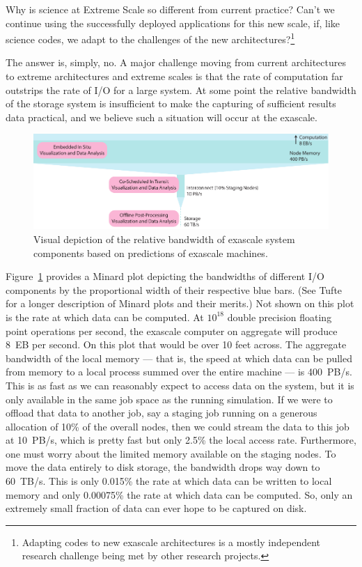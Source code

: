 Why is science at Extreme Scale so different from current practice?  Can't
we continue using the successfully deployed applications for this new
scale, if, like science codes, we adapt to the challenges of the new
architectures?\footnote{Adapting \vda codes to new exascale architectures
  is a mostly independent research challenge being met by other research
  projects.}

The answer is, simply, no.  A major challenge moving from current
architectures to extreme architectures and extreme scales is that the rate
of computation far outstrips the rate of I/O for a large system.  At some
point the relative bandwidth of the storage system is insufficient to make
the capturing of sufficient results data practical, and we believe such a
situation will occur at the exascale.

\begin{figure}[htb]
  \centering
  \includegraphics{figures/IOBandwidths}
  \caption[Relative bandwidth of exascale system components.]{Visual
    depiction of the relative bandwidth of exascale system components based
    on predictions of exascale
    machines.}
  \label{fig:IOBandwidths}
\end{figure}

Figure~\ref{fig:IOBandwidths} provides a Minard plot depicting the
bandwidths of different I/O components by the proportional width of their
respective blue bars.  (See Tufte for a longer description
of Minard plots and their merits.)  Not shown on this plot is the rate at
which data can be computed.  At $10^{18}$ double precision floating point
operations per second, the exascale computer on aggregate will produce 8~EB
per second.  On this plot that would be over 10 feet across.  The aggregate
bandwidth of the local memory --- that is, the speed at which data can be
pulled from memory to a local process summed over the entire machine --- is
400~PB/s.  This is as fast as we can reasonably expect to access data on
the system, but it is only available in the same job space as the running
simulation.  If we were to offload that data to another job, say a staging
job running on a generous allocation of 10\% of the overall nodes, then we
could stream the data to this job at 10~PB/s, which is pretty fast but only
2.5\% the local access rate.  Furthermore, one must worry about the limited
memory available on the staging nodes.  To move the data entirely to disk
storage, the bandwidth drops way down to 60~TB/s.  This is only 0.015\% the
rate at which data can be written to local memory and only 0.00075\% the
rate at which data can be computed.  So, only an extremely small fraction
of data can ever hope to be captured on disk.

